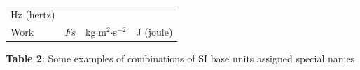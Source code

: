 {{\begin{center}
\begin{xtabular}[t]{|l|l|l|l|}
    
        Hz (hertz)%
     \tabularnewline{}
    
    
        Work &
    
    
        
                \begin{math}Fs\end{math}
               &
    
    
        kg\begin{math}\ensuremath{\cdot}\end{math}m\begin{math}{}^{2}\end{math}\begin{math}\ensuremath{\cdot}\end{math}s\begin{math}{}^{-2}\end{math} &
    
    
        J (joule)%
     \tabularnewline{}
    \end{xtabular}
      \end{center}
    \begin{center}{\small\bfseries Table 2}: Some examples of combinations of SI base units assigned
special names\end{center}
    
}}
